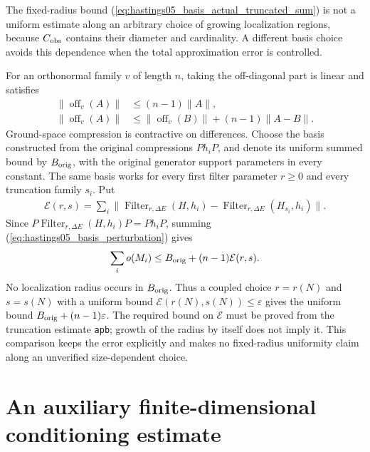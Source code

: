 \documentclass{article}
\begin{document}
The fixed-radius bound (\ref{eq:hastings05_basis_actual_truncated_sum}) is not a
uniform estimate along an arbitrary choice of growing localization regions,
because $C_{\rm obs}$ contains their diameter and cardinality. A different basis
choice avoids this dependence when the total approximation error is controlled.

For an orthonormal family $v$ of length $n$, taking the off-diagonal part is
linear and satisfies
\begin{align}
 \|\operatorname{off}_v(A)\|&\le(n-1)\|A\|,\nonumber\\
 \|\operatorname{off}_v(A)\|
 &\le\|\operatorname{off}_v(B)\|+(n-1)\|A-B\|.
 \label{eq:hastings05_basis_perturbation}
\end{align}
Ground-space compression is contractive on differences. Choose the basis
constructed from the original compressions $Ph_iP$, and denote its uniform
summed bound by $B_{\rm orig}$, with the original generator support parameters
in every constant. The same basis works for every first filter parameter
$r\ge0$ and every truncation family $s_i$. Put
\begin{align}
 \mathcal E(r,s)=\sum_i\|
 \operatorname{Filter}_{r,\Delta E}(H,h_i)-
 \operatorname{Filter}_{r,\Delta E}(H_{s_i},h_i)\|.
 \label{eq:hastings05_basis_total_truncation_error}
\end{align}
Since $P\operatorname{Filter}_{r,\Delta E}(H,h_i)P=Ph_iP$, summing
(\ref{eq:hastings05_basis_perturbation}) gives
\begin{align}
 \sum_i o(M_i)\le B_{\rm orig}+(n-1)\mathcal E(r,s).
 \label{eq:hastings05_basis_coupled_radius}
\end{align}
No localization radius occurs in $B_{\rm orig}$. Thus a coupled choice
$r=r(N)$ and $s=s(N)$ with a uniform bound $\mathcal E(r(N),s(N))\le\varepsilon$
gives the uniform bound $B_{\rm orig}+(n-1)\varepsilon$.
The required bound on $\mathcal E$ must be proved from the truncation estimate
\texttt{apb}; growth of the radius by itself does not imply it. This comparison
keeps the error explicitly and makes no fixed-radius uniformity claim along
an unverified size-dependent choice.

\section{An auxiliary finite-dimensional conditioning estimate}
\end{document}
